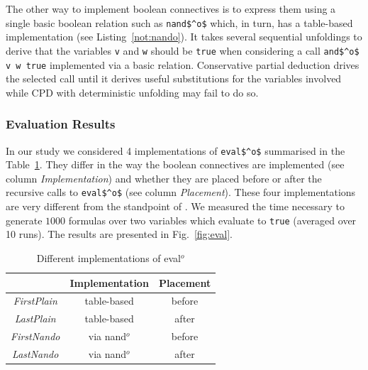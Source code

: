 The other way to implement boolean connectives is to express them using a single basic boolean relation such as \lstinline{nand$^o$} which, in turn, has a table-based
implementation (see Listing~\ref{not:nando}). It takes several sequential unfoldings to derive that the variables \lstinline{v} and \lstinline{w} should
be \lstinline{true} when considering a call \lstinline{and$^o$ v w true} implemented via a basic relation.
Conservative partial deduction drives the selected call until it derives useful substitutions for the variables involved while CPD with deterministic unfolding may fail to do so.


\subsubsection{Evaluation Results}

In our study we considered 4 implementations of \lstinline{eval$^o$} summarised in the Table~\ref{tbl:eval}. They differ in the way the boolean connectives are implemented (see column \emph{Implementation}) and whether they are placed before or after the recursive calls to \lstinline{eval$^o$} (see column \emph{Placement}).
These four implementations are very different from the  standpoint of \ecce.
We measured the time necessary to generate $1000$ formulas over two variables which evaluate to \lstinline{true} (averaged over 10 runs).
The results are presented in Fig.~\ref{fig:eval}.

\begin{table}[!h]
    \centering
    \begin{tabular}{c||c||c}
                      & Implementation & Placement \\ \hline\hline
    \emph{FirstPlain} & table-based    & before \\ \hline
    \emph{LastPlain}  & table-based    & after  \\ \hline
    \emph{FirstNando} & via nand$^o$   & before \\ \hline
    \emph{LastNando}  & via nand$^o$   & after  \\
    \end{tabular}

  \caption{Different implementations of eval$^o$}
  \label{tbl:eval}
\end{table}

